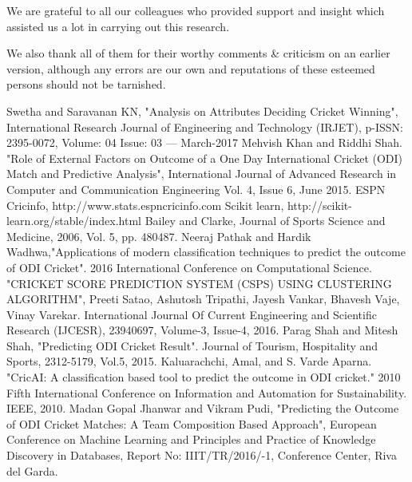 \documentclass[a4paper, 10pt, conference]{IEEEtran}
\begin{document}
We are grateful to all our colleagues who provided support and insight which assisted us a lot in carrying out this research.
  
We also thank all of them for their worthy comments \& criticism on an earlier version, although any errors are our own and reputations of these esteemed persons should not be tarnished.



\begin{thebibliography}{99}

 Swetha and Saravanan KN, "Analysis on Attributes Deciding Cricket Winning", International Research Journal of Engineering and Technology (IRJET), p-ISSN: 2395-0072, Volume: 04 Issue: 03 — March-2017
 Mehvish Khan and Riddhi Shah. "Role of External Factors on Outcome of a One Day International Cricket (ODI) Match and Predictive Analysis", International Journal of Advanced Research in Computer and Communication Engineering Vol. 4, Issue 6, June 2015.
 ESPN Cricinfo, http://www.stats.espncricinfo.com
 Scikit learn, http://scikit-learn.org/stable/index.html
 Bailey and Clarke, Journal of Sports Science and Medicine, 2006, Vol. 5, pp. 480487.
 Neeraj Pathak and Hardik Wadhwa,"Applications of modern classification techniques to predict the outcome of ODI Cricket". 2016 International Conference on Computational Science.
 "CRICKET SCORE PREDICTION SYSTEM (CSPS) USING CLUSTERING ALGORITHM", Preeti Satao, Ashutosh Tripathi, Jayesh Vankar, Bhavesh Vaje, Vinay Varekar.  International Journal Of Current Engineering and Scientiﬁc Research (IJCESR), 23940697, Volume-3, Issue-4, 2016.
 Parag Shah and Mitesh Shah, "Predicting ODI Cricket Result". Journal of Tourism, Hospitality and Sports, 2312-5179, Vol.5, 2015.
 Kaluarachchi, Amal, and S. Varde Aparna. "CricAI: A classiﬁcation based tool to predict the outcome in ODI cricket." 2010 Fifth International Conference on Information and Automation for Sustainability. IEEE, 2010.
  Madan Gopal Jhanwar and Vikram Pudi, "Predicting the Outcome of ODI Cricket Matches: A Team Composition Based Approach", European Conference on Machine Learning and Principles and Practice of Knowledge Discovery in Databases, Report No: IIIT/TR/2016/-1, Conference Center, Riva del Garda.

\end{thebibliography}
\end{document}
